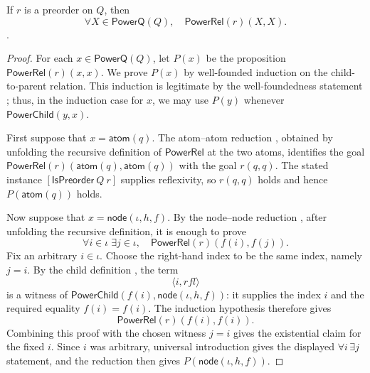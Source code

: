 \begin{lemma}
If $r$ is a preorder on $Q$, then
\[
\forall X\in\mathsf{PowerQ}(Q),\quad
\mathsf{PowerRel}(r)(X,X).
\].
\end{lemma}
\begin{proof}
For each $x\in\mathsf{PowerQ}(Q)$, let $P(x)$ be the proposition
\(\mathsf{PowerRel}(r)(x,x)\).  We prove $P(x)$ by well-founded induction
on the child-to-parent relation.  This induction is legitimate by the
well-foundedness statement ; thus, in the
induction case for $x$, we may use $P(y)$ whenever
$\mathsf{PowerChild}(y,x)$.

First suppose that $x=\mathsf{atom}(q)$.  The atom--atom reduction
, obtained by unfolding the recursive definition
of $\mathsf{PowerRel}$ at the two atoms, identifies the goal
\(\mathsf{PowerRel}(r)(\mathsf{atom}(q),\mathsf{atom}(q))\) with the goal
$r(q,q)$.  The stated instance $[\mathsf{IsPreorder}\ Q\ r]$ supplies
reflexivity, so $r(q,q)$ holds and hence $P(\mathsf{atom}(q))$ holds.

Now suppose that $x=\mathsf{node}(\iota,h,f)$.  By the node--node reduction
, after unfolding the recursive definition, it is
enough to prove
\[
\forall i\in\iota\;\exists j\in\iota,
\quad \mathsf{PowerRel}(r)(f(i),f(j)).
\]
Fix an arbitrary $i\in\iota$.  Choose the right-hand index to be the same
index, namely $j=i$.  By the child definition , the
term
\[
\langle i,\mathord{rfl}\rangle
\]
is a witness of
$\mathsf{PowerChild}(f(i),\mathsf{node}(\iota,h,f))$: it supplies the
index $i$ and the required equality $f(i)=f(i)$.  The induction hypothesis
therefore gives
\[
\mathsf{PowerRel}(r)(f(i),f(i)).
\]
Combining this proof with the chosen witness $j=i$ gives the existential
claim for the fixed $i$.  Since $i$ was arbitrary, universal introduction
gives the displayed $\forall i\,\exists j$ statement, and the reduction
then gives $P(\mathsf{node}(\iota,h,f))$.
\end{proof}
